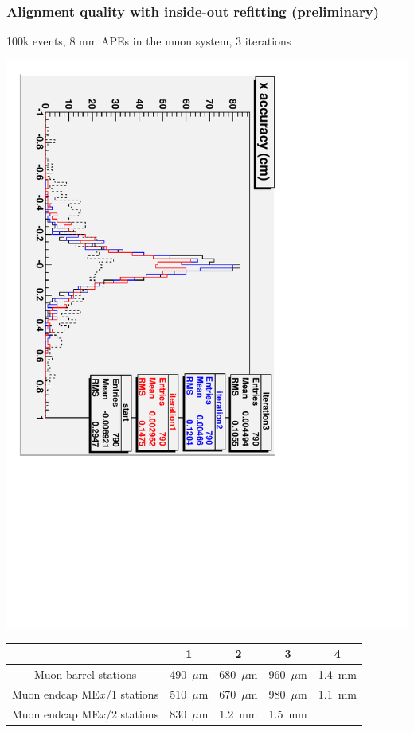 \documentclass[compress]{beamer}
\begin{document}
\begin{frame}
\frametitle{Alignment quality with inside-out refitting (preliminary)}

100k events, 8 mm APEs in the muon system, 3 iterations

\begin{center}
\includegraphics[height=0.6\linewidth, angle=90]{xaccuracy_3iters.pdf}
\end{center}

\vspace{-0.25 cm}
\hspace{-0.5 cm} \begin{minipage}{\linewidth}
\begin{tabular}{c c c c c}
& 1 & 2 & 3 & 4 \\\hline
Muon barrel stations & 490~$\mu$m & 680~$\mu$m & 960~$\mu$m & 1.4~mm \\
Muon endcap ME$x$/1 stations & 510~$\mu$m & 670~$\mu$m & 980~$\mu$m & 1.1~mm\\
Muon endcap ME$x$/2 stations & 830~$\mu$m & 1.2~mm & 1.5~mm & \\
\end{tabular}
\end{minipage}
\end{frame}
\end{document}
